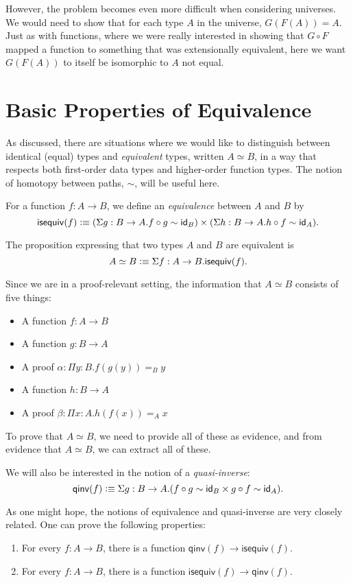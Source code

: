 \documentclass[12pt]{article}
\newcommand{\iseq}{\mathsf{isequiv}}
\newcommand{\qinv}{\mathsf{qinv}}
\newcommand*{\comp}{\mathbin{\circ}}
\begin{document}
However, the problem becomes even more difficult when considering universes.
We would need to show that for each type $A$ in the universe, $G(F(A)) = A$.
Just as with functions, where we were really interested in showing that $G
\circ F$ mapped a function to something that was extensionally equivalent, here
we want $G(F(A))$ to itself be isomorphic to $A$ not equal.

\section{Basic Properties of Equivalence}\label{sec:equiv}

As discussed, there are situations where we would like to distinguish between 
identical (equal) types and \emph{equivalent} types, written $A\simeq B$, in 
a way that respects both first-order data types and higher-order function types.
The notion of homotopy between paths, $\sim$, will be useful here.


 For a function $f:A \to B$, we define an \emph{equivalence} between $A$ and $B$ by
  $$\iseq(f)\defeq (\Sigma g: B\to A.f\comp g \sim \id_B)\times (\Sigma h: B\to A.h\comp f \sim \id_A).$$
  
 The proposition expressing that two types $A$ and $B$ are equivalent is
  $$A\simeq B\defeq \Sigma f: A\to B.\iseq(f).$$
  
Since we are in a proof-relevant setting, the information that $A\simeq B$ 
consists of five things:
\begin{itemize}
 \item A function $f:A\to B$
 \item A function $g: B\to A$
 \item A proof $\alpha: \Pi y:B.f(g(y)) =_B y$
 \item A function $h: B\to A$
 \item A proof $\beta: \Pi x:A.h(f(x)) =_A x$
\end{itemize}

To prove that $A\simeq B$, we need to provide all of these as evidence, and from
evidence that $A\simeq B$, we can extract all of these.
  
 We will also be interested in the notion of a \emph{quasi-inverse}:
  $$\qinv(f)\defeq \Sigma g:B\to A.(f\comp g\sim \id_B \times g\comp f\sim \id_A).$$
  
As one might hope, the notions of equivalence and quasi-inverse are very closely related.
One can prove the following properties:

\begin{enumerate}
 \item For every $f:A\to B$, there is a function $\qinv(f) \to \iseq(f)$.
 \item For every $f:A\to B$, there is a function $\iseq(f) \to \qinv(f)$.
\end{enumerate}
\end{document}
